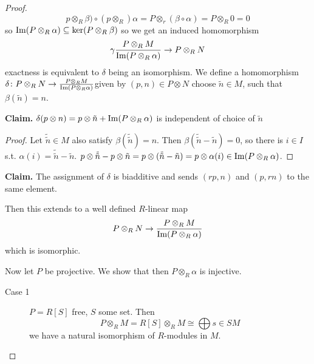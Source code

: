 \documentclass[language=english]{TemplateLecture}
\begin{document}
\begin{proof}
    \[p\otimes_R \beta) \circ (p\otimes_R) \alpha = P\otimes_r (\beta\circ \alpha) = P\otimes_R 0 = 0\]
    so \(\operatorname{Im}(P\otimes_R \alpha) \subseteq \ker(P\otimes_R \beta)\) so we get an induced homomorphism
    \[\gamma \frac{P\otimes_R M}{\operatorname{Im}(P\otimes_R \alpha)} \to P\otimes_R N\]
    exactness is equivalent to \(\delta\) being an isomorphism.
    We define a homomorphism \(\delta\colon P\otimes_R N \to \frac{P\otimes_R M}{\operatorname{Im}(P\otimes_R \alpha)}\)given by \((p,n) \in P\otimes N\) choose \(\tilde n \in M\), such that \(\beta(\tilde n) = n\).

    \textbf{Claim.} \(\delta(p\otimes n) = p\otimes \tilde n + \operatorname{Im}(P\otimes_R \alpha)\) is independent of choice of \(\tilde n\)
    \begin{proof}
        Let \(\tilde\tilde n \in M\) also satisfy \(\beta(\tilde{\tilde n}) = n\). Then \(\beta(\tilde{\tilde n} - \tilde n) = 0\), so there is \(i \in I\) s.t. \(\alpha(i) = \tilde{\tilde n} - \tilde n\). \(p \otimes \tilde{\tilde n} - p\otimes \tilde n = p\otimes (\tilde{\tilde n} - \tilde n) = p\otimes \alpha(i) \in \operatorname{Im}(P\otimes_R \alpha)\).
    \end{proof}

    \textbf{Claim.} The assignment of \(\delta\) is biadditive and sends \((rp,n)\) and \((p, rn)\) to the same element.

    Then this extends to a well defined \(R\)-linear map
    \[P\otimes_R N \to \frac{P\otimes_R M}{\operatorname{Im}(P\otimes_R \alpha)}\]
    which is isomorphic.

    Now let \(P\) be projective. We show that then \(P \otimes_R \alpha\) is injective.

    \begin{description}
        \item[Case 1] \(P = R[S]\) free, \(S\) some set. Then
        \[P \otimes_R M = R[S] \otimes_R M \cong \bigoplus{s \in S} M\]
        we have a natural isomorphism of \(R\)-modules in \(M\).


\end{description}
\end{proof}
\end{document}
